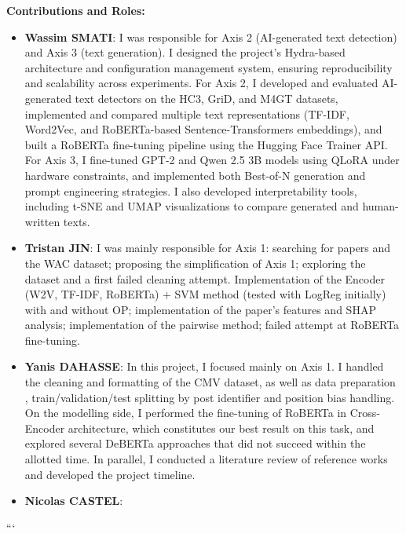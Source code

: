 \documentclass[11pt,a4paper]{article}
\begin{document}
\textbf{Contributions and Roles:}

\begin{itemize}

    \item \textbf{Wassim SMATI}: I was  responsible for Axis 2 (AI-generated text detection) and Axis 3 (text generation). I designed the project's Hydra-based architecture and configuration management system, ensuring reproducibility and scalability across experiments. For Axis 2, I developed and evaluated AI-generated text detectors on the HC3, GriD, and M4GT datasets, implemented and compared multiple text representations (TF-IDF, Word2Vec, and RoBERTa-based Sentence-Transformers embeddings), and built a RoBERTa fine-tuning pipeline using the Hugging Face Trainer API. For Axis 3, I fine-tuned GPT-2 and Qwen 2.5 3B models using QLoRA under hardware constraints, and implemented both Best-of-N generation and prompt engineering strategies. I also developed interpretability tools, including t-SNE and UMAP visualizations to compare generated and human-written texts.

    \item \textbf{Tristan JIN}: I was mainly responsible for Axis 1: searching for papers and the WAC dataset; proposing the simplification of Axis 1; exploring the dataset and a first failed cleaning attempt. Implementation of the Encoder (W2V, TF-IDF, RoBERTa) + SVM method (tested with LogReg initially) with and without OP; implementation of the paper's features and SHAP analysis; implementation of the pairwise method; failed attempt at RoBERTa fine-tuning.

    \item \textbf{Yanis DAHASSE}: In this project, I focused mainly on Axis 1. I handled the cleaning and formatting of the CMV dataset, as well as data preparation , train/validation/test splitting by post identifier and position bias handling. On the modelling side, I performed the fine-tuning of RoBERTa in Cross-Encoder architecture, which constitutes our best result on this task, and explored several DeBERTa approaches that did not succeed within the allotted time. In parallel, I conducted a literature review of reference works and developed the project timeline.

    \item \textbf{Nicolas CASTEL}:

\end{itemize}
```

\vspace{1cm}
\end{document}
